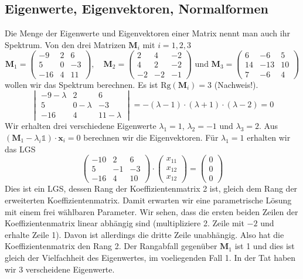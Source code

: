 \subsection{Eigenwerte, Eigenvektoren, Normalformen}
Die Menge der Eigenwerte und Eigenvektoren einer Matrix nennt man auch ihr Spektrum. Von den drei Matrizen $\mathbf{M}_i$ mit $i=1,2,3$
\[
  \mathbf{M}_1=\begin{pmatrix}
    -9&2&6\\5&0&-3\\-16&4&11
  \end{pmatrix},\quad
  \mathbf{M}_2=\begin{pmatrix}
    2&4&-2\\4&2&-2\\-2&-2&-1
  \end{pmatrix}\text{ und }
  \mathbf{M}_3=\begin{pmatrix}
    6&-6&5\\14&-13&10\\7&-6&4
  \end{pmatrix}
\]
wollen wir das Spektrum berechnen. Es ist $\text{Rg}(\mathbf{M}_i)=3$ (Nachweis!).
\[
  \begin{vmatrix}
    -9-\lambda&2&6\\5&0-\lambda&-3\\-16&4&11-\lambda
  \end{vmatrix}
  =-(\lambda-1)\cdot(\lambda+1)\cdot(\lambda-2)=0
\]
Wir erhalten drei verschiedene Eigenwerte $\lambda_1=1$, $\lambda_2=-1$ und $\lambda_3=2$. Aus $(\mathbf{M}_1-\lambda_i\mathds{1})\cdot\mathbf{x}_i=0$ berechnen wir die Eigenvektoren.  Für $\lambda_1=1$ erhalten wir das LGS \[
 \begin{pmatrix}-10&2&6\\5&-1&-3\\-16&4&10\end{pmatrix}\cdot
 \begin{pmatrix}x_{11}\\x_{12}\\x_{12}\end{pmatrix}=
 \begin{pmatrix}0\\0\\0\end{pmatrix}
\]
Dies ist ein LGS, dessen Rang der Koeffizientenmatrix 2 ist, gleich dem Rang der erweiterten Koeffizientenmatrix. Damit erwarten wir eine parametrische Lösung mit einem frei wählbaren Parameter.
Wir sehen, dass die ersten beiden Zeilen der Koeffizientenmatrix linear abhängig sind (multipliziere 2. Zeile mit $-2$ und erhalte Zeile 1). Davon ist allerdings die dritte Zeile unabhängig. Also hat die Koeffizientenmatrix den Rang 2. Der Rangabfall gegenüber $\mathbf{M}_1$ ist 1 und dies ist gleich der Vielfachheit des Eigenwertes, im voeliegenden Fall 1. In der Tat haben wir 3 verscheidene Eigenwerte.

